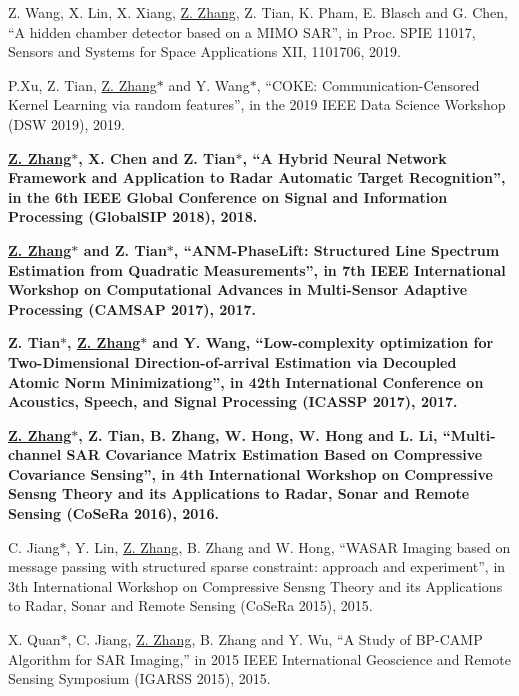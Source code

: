\documentclass[paper=a4,fontsize=11pt]{scrartcl}
\begin{document}
\begin{description}
	
\item {Z. Wang, X. Lin, X. Xiang, \underline{Z. Zhang}, Z. Tian, K. Pham, E. Blasch and G. Chen, ``A hidden chamber detector based on a MIMO SAR'', in Proc. SPIE 11017, Sensors and Systems for Space Applications XII, 1101706, 2019.}	
	
\item {P.Xu, Z. Tian, \underline{Z. Zhang$\ast$} and Y. Wang$\ast$, ``COKE: Communication-Censored Kernel Learning via random features'', in the 2019 IEEE Data Science Workshop (DSW 2019), 2019.}	
	
\item \textbf{\underline{Z. Zhang$\ast$}, X. Chen and Z. Tian$\ast$, ``A Hybrid Neural Network Framework and Application to Radar Automatic Target Recognition'', in the 6th IEEE Global Conference on Signal and Information Processing (GlobalSIP 2018), 2018.}

\item \textbf{\underline{Z. Zhang$\ast$} and Z. Tian$\ast$, ``ANM-PhaseLift: Structured Line Spectrum Estimation from Quadratic Measurements'', in 7th IEEE International Workshop on Computational Advances in Multi-Sensor Adaptive Processing (CAMSAP 2017), 2017.}

\item \textbf{Z. Tian$\ast$, \underline{Z. Zhang$\ast$} and Y. Wang, ``Low-complexity optimization for Two-Dimensional Direction-of-arrival Estimation via Decoupled Atomic Norm Minimizationg'', in 42th International Conference on Acoustics, Speech, and Signal Processing (ICASSP 2017), 2017.}

\item \textbf{\underline{Z. Zhang$\ast$}, Z. Tian, B. Zhang, W. Hong, W. Hong and L. Li, ``Multi-channel SAR Covariance Matrix Estimation Based on Compressive Covariance Sensing'', in 4th International Workshop on Compressive Sensng Theory and its Applications to Radar, Sonar and Remote Sensing (CoSeRa 2016), 2016.}

\item C. Jiang$\ast$, Y. Lin, \underline{Z. Zhang}, B. Zhang and W. Hong, ``WASAR Imaging based on message passing with structured sparse constraint: approach and experiment'', in 3th International Workshop on Compressive Sensng Theory and its Applications to Radar, Sonar and Remote Sensing (CoSeRa 2015), 2015.

\item X. Quan$\ast$, C. Jiang, \underline{Z. Zhang}, B. Zhang and Y. Wu, ``A Study of BP-CAMP Algorithm for SAR Imaging,'' in 2015 IEEE International Geoscience and Remote Sensing Symposium (IGARSS 2015), 2015.


\end{description}
\end{document}
